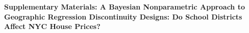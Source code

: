 \documentclass[12pt]{article}
\begin{document}


\pagebreak
\begin{center}
	\bf
	\LARGE
	Supplementary Materials: A Bayesian Nonparametric Approach to Geographic Regression Discontinuity Designs:
    Do School Districts Affect NYC House Prices?
	
\end{center}
\setcounter{equation}{0}
\setcounter{figure}{0}
\setcounter{table}{0}
\setcounter{section}{0}
\newcommand{\sprefix}{S-}
\renewcommand{\theequation}{\sprefix\arabic{equation}}
\renewcommand{\thesection}{\sprefix\arabic{section}}
\renewcommand{\thefigure}{\sprefix\arabic{figure}}
\renewcommand{\thetable}{\sprefix\arabic{table}}


\end{document}
